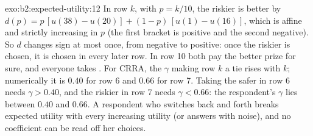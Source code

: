\begin{solution}{exo:b2:expected-utility:12}
In row $k$, with $p = k/10$, the riskier  is better by $d(p) = p\,[u(38) - u(20)] + (1 -
p)\,[u(1) - u(16)]$, which is affine and strictly increasing in $p$ (the first bracket is positive and
the second negative). So $d$ changes sign at most once, from negative to positive: once the riskier
 is chosen, it is chosen in every later row. In row 10 both pay the better prize for sure, and
everyone takes . For CRRA, the $\gamma$ making row $k$ a tie rises with $k$; numerically it is
$0.40$ for row 6 and $0.66$ for row 7. Taking the safer  in row 6 needs $\gamma > 0.40$, and the
riskier in row 7 needs $\gamma < 0.66$: the respondent's $\gamma$ lies between $0.40$ and $0.66$. A
respondent who switches back and forth breaks expected utility with every increasing utility (or
answers with noise), and no coefficient can be read off her choices.
\end{solution}

